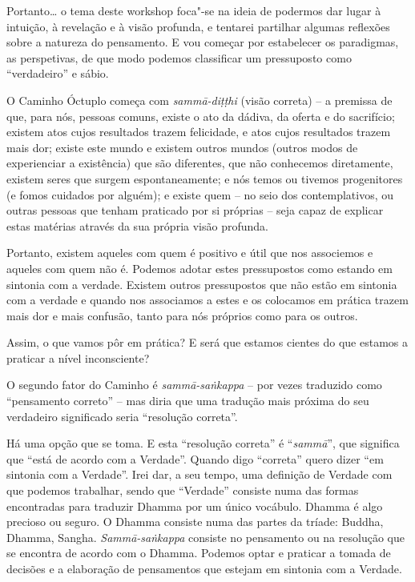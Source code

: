 Portanto\ldots{} o tema deste workshop foca"-se na ideia de podermos dar lugar à
intuição, à revelação e à visão profunda, e tentarei partilhar algumas reflexões
sobre a natureza do pensamento. E vou começar por estabelecer os paradigmas, as
perspetivas, de que modo podemos classificar um pressuposto como ``verdadeiro''
e sábio.

O Caminho Óctuplo começa com \emph{sammā-diṭṭhi} (visão correta) -- a premissa
de que, para nós, pessoas comuns, existe o ato da dádiva, da oferta e do
sacrifício; existem atos cujos resultados trazem felicidade, e atos cujos
resultados trazem mais dor; existe este mundo e existem outros mundos (outros
modos de experienciar a existência) que são diferentes, que não conhecemos
diretamente, existem seres que surgem espontaneamente; e nós temos ou tivemos
progenitores (e fomos cuidados por alguém); e existe quem -- no seio dos
contemplativos, ou outras pessoas que tenham praticado por si próprias -- seja
capaz de explicar estas matérias através da sua própria visão profunda.

\enlargethispage{\baselineskip}

Portanto, existem aqueles com quem é positivo e útil que nos associemos e
aqueles com quem não é. Podemos adotar estes pressupostos como estando em
sintonia com a verdade. Existem outros pressupostos que não estão em sintonia
com a verdade e quando nos associamos a estes e os colocamos em prática trazem
mais dor e mais confusão, tanto para nós próprios como para os outros.

Assim, o que vamos pôr em prática? E será que estamos cientes do que estamos a
praticar a nível inconsciente?

O segundo fator do Caminho é \emph{sammā-saṅkappa} -- por vezes traduzido como
``pensamento correto'' -- mas diria que uma tradução mais próxima do seu
verdadeiro significado seria ``resolução correta''.

\enlargethispage{\baselineskip}

Há uma opção que se toma. E esta ``resolução correta'' é ``\emph{sammā}'', que
significa que ``está de acordo com a Verdade''. Quando digo ``correta'' quero
dizer ``em sintonia com a Verdade''. Irei dar, a seu tempo, uma definição de
Verdade com que podemos trabalhar, sendo que ``Verdade'' consiste numa das
formas encontradas para traduzir Dhamma por um único vocábulo. Dhamma é algo
precioso ou seguro. O Dhamma consiste numa das partes da tríade: Buddha, Dhamma,
Sangha. \emph{Sammā-saṅkappa} consiste no pensamento ou na resolução que se
encontra de acordo com o Dhamma. Podemos optar e praticar a tomada de decisões e
a elaboração de pensamentos que estejam em sintonia com a Verdade.

